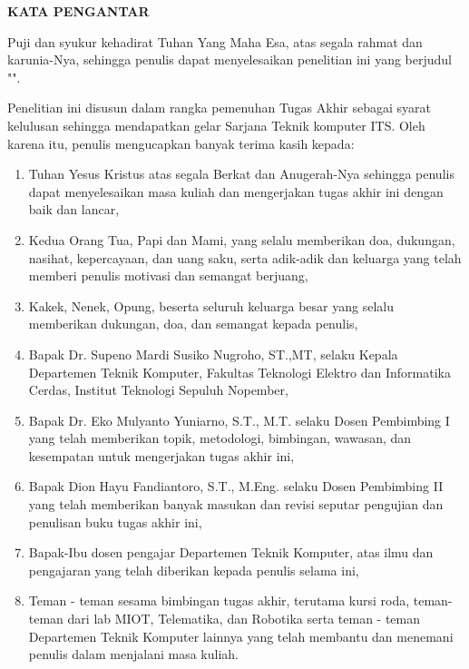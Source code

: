 \begin{center}
  \Large
  \textbf{KATA PENGANTAR}
\end{center}


\vspace{2ex}


Puji dan syukur kehadirat Tuhan Yang Maha Esa, atas segala rahmat dan karunia-Nya,
sehingga penulis dapat menyelesaikan penelitian ini yang berjudul
"\tatitle".

Penelitian ini disusun dalam rangka pemenuhan Tugas Akhir sebagai syarat kelulusan sehingga mendapatkan gelar Sarjana Teknik komputer ITS. Oleh karena itu, penulis mengucapkan banyak terima kasih kepada:

\begin{enumerate}[nolistsep]
  \item Tuhan Yesus Kristus atas segala Berkat dan Anugerah-Nya sehingga penulis dapat menyelesaikan masa kuliah dan mengerjakan tugas akhir ini dengan baik dan lancar,

  \item Kedua Orang Tua, Papi dan Mami, yang selalu memberikan doa, dukungan, nasihat, kepercayaan, dan uang saku, serta adik-adik dan keluarga yang telah memberi penulis motivasi dan semangat berjuang,
  
  \item Kakek, Nenek, Opung, beserta seluruh keluarga besar yang selalu memberikan dukungan, doa, dan semangat kepada penulis,

  \item Bapak Dr. Supeno Mardi Susiko Nugroho, ST.,MT, selaku Kepala Departemen Teknik Komputer, Fakultas Teknologi Elektro dan Informatika Cerdas, Institut Teknologi Sepuluh Nopember,

  \item Bapak Dr. Eko Mulyanto Yuniarno, S.T., M.T. selaku Dosen Pembimbing I yang telah memberikan topik, metodologi, bimbingan, wawasan, dan kesempatan untuk mengerjakan tugas akhir ini,

  \item Bapak Dion Hayu Fandiantoro, S.T., M.Eng. selaku Dosen Pembimbing II yang telah memberikan banyak masukan dan revisi seputar pengujian dan penulisan buku tugas akhir ini,

  \item Bapak-Ibu dosen pengajar Departemen Teknik Komputer, atas ilmu dan pengajaran yang telah diberikan kepada penulis selama ini,
  
  \item Teman - teman sesama bimbingan tugas akhir, terutama kursi roda, teman-teman dari lab MIOT, Telematika, dan Robotika serta teman - teman Departemen Teknik Komputer lainnya yang telah membantu dan menemani penulis dalam menjalani masa kuliah.

\end{enumerate}

